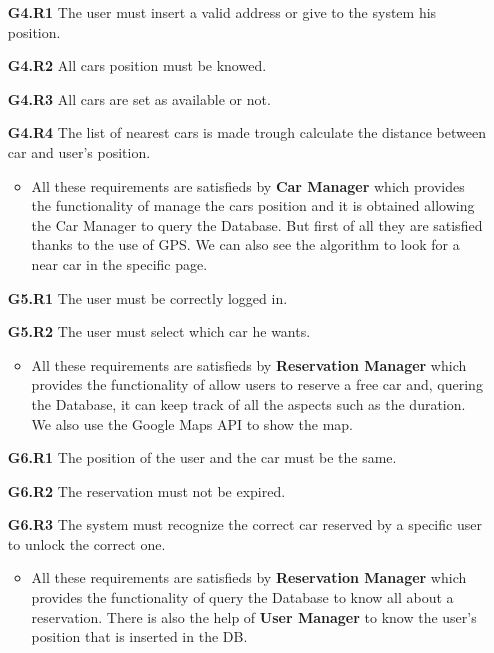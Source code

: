 \begin{itemize}
\item[\textbf{G4.R1}] The user must insert a valid address or give to the system his position.
\item[\textbf{G4.R2}] All cars position must be knowed.
\item[\textbf{G4.R3}] All cars are set as available or not.
\item[\textbf{G4.R4}] The list of nearest cars is made trough calculate the distance between car and user's position.
\begin{itemize}
\item All these requirements are satisfieds by \textbf{Car Manager} which provides the functionality of manage the cars position and it is obtained allowing the Car Manager to query the Database. But first of all they are satisfied thanks to the use of GPS. We can also see the algorithm to look for a near car in the specific page.
\end{itemize}

\item[\textbf{G5.R1}] The user must be correctly logged in.
\item[\textbf{G5.R2}] The user must select which car he wants.
\begin{itemize}
\item All these requirements are satisfieds by \textbf{Reservation Manager} which provides the functionality of allow users to reserve a free car and, quering the Database, it can keep track of all the aspects such as the duration. We also use the Google Maps API to show the map.
\end{itemize}

\item[\textbf{G6.R1}] The position of the user and the car must be the same.
\item[\textbf{G6.R2}] The reservation must not be expired.
\item[\textbf{G6.R3}] The system must recognize the correct car reserved by a specific user to unlock the correct one.
\begin{itemize}
\item All these requirements are satisfieds by \textbf{Reservation Manager} which provides the functionality of query the Database to know all about a reservation. There is also the help of \textbf{User Manager} to know the user's position that is inserted in the DB.
\end{itemize}


\end{itemize}

